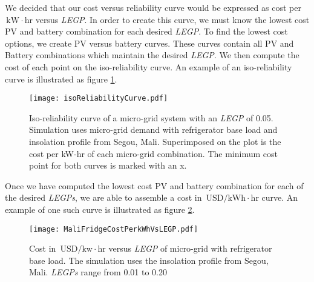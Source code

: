 \documentclass{article}
\newcommand{\unit}[1]{\ensuremath{\, \mathrm{#1}}}
\begin{document}
We decided that our cost versus reliability curve would be expressed as cost per \unit{kW \! \cdot \! hr} versus \emph{LEGP}.
In order to create this curve, we must know the lowest cost PV and battery combination for each desired \emph{LEGP}.
To find the lowest cost options, we create PV versus battery curves.
These curves contain all PV and Battery combinations which maintain the desired \emph{LEGP}. 
We then compute the cost of each point on the iso-reliability curve.
An example of an iso-reliability curve is illustrated as figure \ref{energyBalance}.
%
%
\begin{figure}[ht] 
  \centering
    \texttt{[image: isoReliabilityCurve.pdf]}
  \caption{Iso-reliability curve of a micro-grid system with an \emph{LEGP} of 0.05. 
Simulation uses micro-grid demand with refrigerator base load and insolation profile from Segou, Mali.
Superimposed on the plot is the cost per kW-hr of each micro-grid combination.
The minimum cost point for both curves is marked with an x.}
\label{energyBalance}
\end{figure}
%
%
Once we have computed the lowest cost PV and battery combination for each of the desired \emph{LEGPs}, we are able to assemble a cost in \unit{USD/kWh\! \cdot \!hr} curve. 
An example of one such curve is illustrated as figure \ref{MaliFridgeCostPerkWhVsLEGP}.
%
%
\begin{figure}[ht] 
  \centering
    \texttt{[image: MaliFridgeCostPerkWhVsLEGP.pdf]}
  \caption{Cost in \unit{USD/kw\! \cdot \! hr} versus \emph{LEGP} of 
micro-grid with refrigerator base load.
The simulation uses the insolation profile from Segou, Mali.
\emph{LEGPs} range from 0.01 to 0.20}
\label{MaliFridgeCostPerkWhVsLEGP}
\end{figure}

\end{document}
